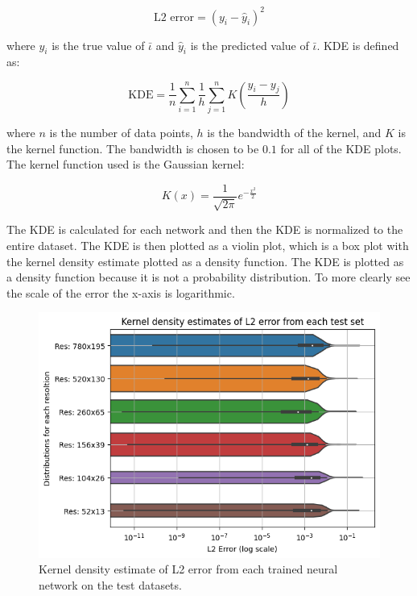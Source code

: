 \begin{equation}
    \label{eq:l2}
    \text{L2 error} = (y_i - \hat{y}_i)^2
\end{equation}

where $y_i$ is the true value of $\bar{\iota}$ and $\hat{y}_i$ is the predicted value of $\bar{\iota}$. KDE is defined as:

\begin{equation}
    \label{eq:kde}
    \text{KDE} = \frac{1}{n} \sum_{i=1}^n \frac{1}{h} \sum_{j=1}^n K\left(\frac{y_i - y_j}{h}\right)
\end{equation}

where $n$ is the number of data points, $h$ is the bandwidth of the kernel, and $K$ is the kernel function. The bandwidth is chosen to be $0.1$ for all of the KDE plots. The kernel function used is the Gaussian kernel:

\begin{equation}
    \label{eq:gaussian}
    K(x) = \frac{1}{\sqrt{2 \pi}} e^{-\frac{x^2}{2}}
\end{equation}

The KDE is calculated for each network and then the KDE is normalized to the entire dataset. The KDE is then plotted as a violin plot, which is a box plot with the kernel density estimate plotted as a density function. The KDE is plotted as a density function because it is not a probability distribution. To more clearly see the scale of the error the x-axis is logarithmic.

\begin{figure}[!htb]
    \centering
    \includegraphics[width = \textwidth]{images/kde_plot.png}
    \caption{Kernel density estimate of L2 error from each trained neural network on the test datasets.} \label{fig:kde}
\end{figure}

